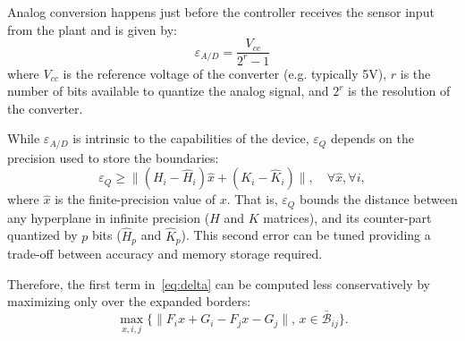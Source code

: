 Analog conversion happens just before the controller receives the sensor input from the plant
and is given by:
\begin{equation*}
\varepsilon_{A/D}=\frac{V_{cc}}{2^{r}-1}
\end{equation*}
where $V_{cc}$ is the reference voltage of the converter (e.g. typically 5V), $r$
is the number of bits available to quantize the analog signal, and $2^{r}$ is
the resolution of the converter.

While $\varepsilon_{A/D}$ is intrinsic to the capabilities of the device,
$\varepsilon_{Q}$ depends on the precision used to store the boundaries:
\begin{equation}\label{eq:quantizationlines}
  \varepsilon_{Q} \ge  \|(H_i - \hat{H}_i) \hat{x} + (K_i - \hat{K}_i)\|, \quad \forall \hat{x},\forall i,
\end{equation}
where $\hat{x}$ is the finite-precision value of $x$.
That is, $\varepsilon_{Q}$ bounds the distance between any hyperplane in infinite
precision ($H$ and $K$ matrices), and its counter-part quantized by $p$ bits 
($\hat{H}_{p}$ and $\hat{K}_{p}$).
This second error can be tuned providing a trade-off between accuracy and
memory storage required.

 Therefore, the first term in~\autoref{eq:delta} can be computed less conservatively by maximizing only over 
 the expanded borders:
 \begin{equation}
 \label{eq:maximization}
 \max_{x,i,j}\{\|F_ix+G_i-F_jx-G_j\|,\,x\in \bar{\mathcal B}_{ij}\}.
 \end{equation}
